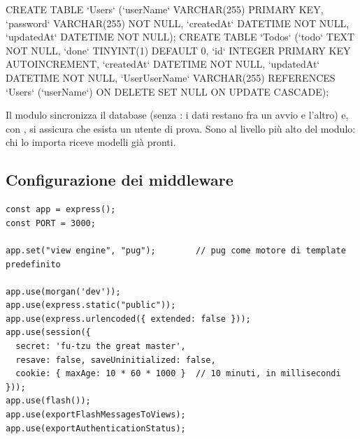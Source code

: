 \begin{console}
CREATE TABLE `Users` (`userName` VARCHAR(255) PRIMARY KEY, `password` VARCHAR(255) NOT NULL, `createdAt` DATETIME NOT NULL, `updatedAt` DATETIME NOT NULL);
CREATE TABLE `Todos` (`todo` TEXT NOT NULL, `done` TINYINT(1) DEFAULT 0, `id` INTEGER PRIMARY KEY AUTOINCREMENT, `createdAt` DATETIME NOT NULL, `updatedAt` DATETIME NOT NULL, `UserUserName` VARCHAR(255) REFERENCES `Users` (`userName`) ON DELETE SET NULL ON UPDATE CASCADE);
\end{console}

Il modulo sincronizza il database (senza : i dati restano fra un
avvio e l'altro) e, con , si assicura che esista un utente
di prova. Sono  al livello più alto del modulo: chi lo importa
riceve modelli già pronti.

\subsection{Configurazione dei middleware}

\begin{affianco}[0.69][c]
\codicepiccolo
\begin{lstlisting}[style=js, name=index.js, firstnumber=11]
const app = express();
const PORT = 3000;

app.set("view engine", "pug");        // pug come motore di template predefinito

app.use(morgan('dev'));
app.use(express.static("public"));
app.use(express.urlencoded({ extended: false }));
app.use(session({
  secret: 'fu-tzu the great master',
  resave: false, saveUninitialized: false,
  cookie: { maxAge: 10 * 60 * 1000 }  // 10 minuti, in millisecondi
}));
app.use(flash());
app.use(exportFlashMessagesToViews);
app.use(exportAuthenticationStatus);
\end{lstlisting}
\risultato
\begin{immagine}
\end{immagine}
\end{affianco}

